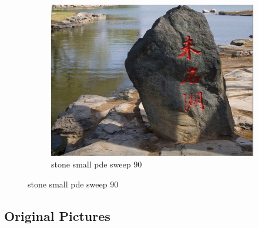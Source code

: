 \documentclass[11pt]{article}
\begin{document}
\begin{figure}[ht!]
\begin{subfigure}[]{0.333\linewidth}
        \centering
        \includegraphics[width=\linewidth]{fig/restoration/stone_small/pde_90.jpg}
        \caption{stone small pde sweep 90}
    \end{subfigure}%
\end{figure}

\subsection{Original Pictures}
\end{document}
